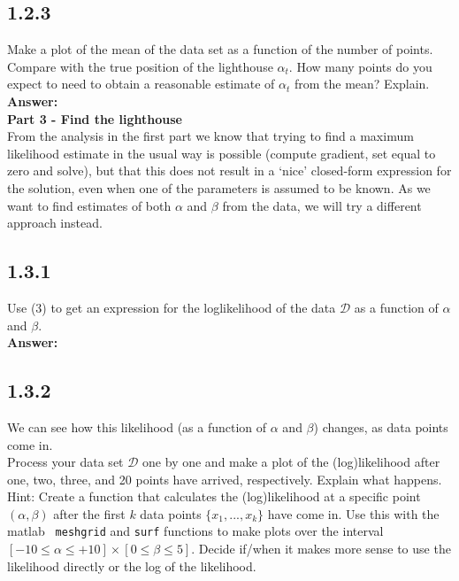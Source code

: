 \documentclass[a4paper]{article}
\begin{document}
\subsection*{1.2.3}

Make a plot of the mean of the data set as a function of the number of points. Compare with the true position of the lighthouse $\alpha_t$. How many points do you expect to need to obtain a reasonable estimate of $\alpha_t$ from the mean? Explain.\\

\textbf{Answer:}\\



\textbf{Part 3 - Find the lighthouse}\\

From the analysis in the first part we know that trying to find a maximum likelihood estimate in the usual way is possible (compute gradient, set equal to zero and solve), but that this does not result in a ‘nice’ closed-form expression for the solution, even when one of the parameters is assumed to be known. As we want to find estimates of both $\alpha$ and $\beta$ from the data, we will try a different approach instead.

\subsection*{1.3.1}

Use (3) to get an expression for the loglikelihood of the data $\mathcal{D}$ as a function of $\alpha$ and $\beta$.\\

\textbf{Answer:}\\


\subsection*{1.3.2}

We can see how this likelihood (as a function of $\alpha$ and $\beta$) changes, as data points come in.\\

Process your data set $\mathcal{D}$ one by one and make a plot of the (log)likelihood after one, two, three, and 20 points have arrived, respectively. Explain what happens.\\

Hint: Create a function that calculates the (log)likelihood at a specific point $(\alpha, \beta)$ after the first $k$ data points $\{x_1, . . . , x_k \}$ have come in. Use this with the matlab \texttt{ meshgrid} and \texttt{surf}  functions to make plots over the interval $[-10 \leq \alpha \leq +10] \times [0 \leq \beta \leq 5]$. Decide if/when it makes more sense to use the likelihood directly or the log of the likelihood.\\
\end{document}

